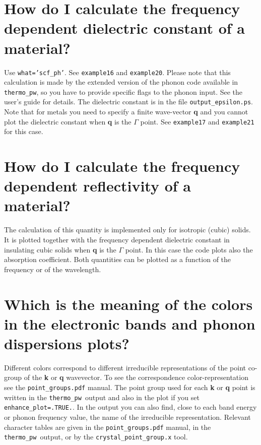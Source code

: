 \documentclass[12pt,a4paper]{article}
\def\thermo{\texttt{thermo\_pw}}
\begin{document}
\newpage
\section{\color{coral}How do I calculate the frequency dependent dielectric
constant of a material?}
Use \texttt{what='scf\_ph'}. See \texttt{example16} and \texttt{example20}. 
Please note that this calculation is made by the extended version of the
phonon code available in \thermo, so you have to provide specific flags
to the phonon input. See the user's guide for details. 
The dielectric constant is in the file \texttt{output\_epsilon.ps}.
Note that for metals you need to specify a finite wave-vector {\bf q} and you 
cannot plot the dielectric constant when {\bf q} is the $\Gamma$ point.  
See \texttt{example17} and \texttt{example21} for this case. 

\newpage
\section{\color{coral}How do I calculate the frequency dependent 
reflectivity of a material?}
The calculation of this quantity is implemented only for isotropic 
(cubic) solids. It is plotted together with the frequency dependent 
dielectric constant in insulating cubic solids when {\bf q} is 
the $\Gamma$ point. In this case the code plots also the 
absorption coefficient. Both quantities can be plotted as a function of
the frequency or of the wavelength.

\newpage
\section{\color{coral} Which is the meaning of the colors in
the electronic bands and phonon dispersions plots?}
Different colors correspond to different irreducible representations of 
the point co-group of the {\bf k} or {\bf q} wavevector. To see the
correspondence color-representation see the \texttt{point\_groups.pdf} 
manual. The point group used for each {\bf k} or {\bf q} point is
written in the \thermo\ output and also in the plot if you set
\texttt{enhance\_plot=.TRUE.}. In the output you can also find,
close to each band energy or phonon frequency value, the name of the
irreducible representation. Relevant character tables are given in the
\texttt{point\_groups.pdf} manual, in the \thermo\ output, or by the
\texttt{crystal\_point\_group.x} tool.
\end{document}
